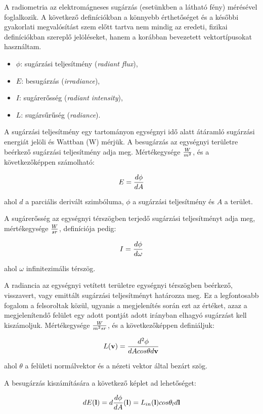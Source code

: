 A radiometria az elektromágneses sugárzás (esetünkben a látható fény) mérésével foglalkozik. A következő definíciókban a könnyebb érthetőséget és a későbbi gyakorlati megvalósítást szem előtt tartva nem mindig az eredeti, fizikai definíciókban szereplő jelöléseket, hanem a korábban bevezetett vektortípusokat használtam.

\begin{itemize}[noitemsep]
\item \(\phi\): sugárzási teljesítmény (\textit{radiant flux}),
\item \(E\): besugárzás (\textit{irradiance}),
\item \(I\): sugárerősség (\textit{radiant intensity}),
\item \(L\): sugársűrűség (\textit{radiance}).
\end{itemize}

A sugárzási teljesítmény egy tartományon egységnyi idő alatt átáramló sugárzási energiát jelöli és Wattban (W) mérjük. A besugárzás az egységnyi területre beérkező sugárzási teljesítmény adja meg. Mértékegysége \(W \over m^2\), és a következőképpen számolható:

\[
E = { { d\phi } \over { dA } }
\]

ahol \(d\) a parciális derivált szimbóluma, \(\phi\) a sugárzási teljesítmény és \(A\) a terület.

A sugárerősség az egységnyi térszögben terjedő sugárzási teljesítményt adja meg, mértékegysége \(W \over {sr}\), definíciója pedig:

\[
I = { { d\phi } \over { d\omega } }
\]

ahol \(\omega\) infinitezimális térszög.

A radiancia az egységnyi vetített területre egységnyi térszögben beérkező, visszavert, vagy emittált sugárzási teljesítményt határozza meg. Ez a legfontosabb fogalom a felsoroltak közül, ugyanis a megjelenítés során ezt az értéket, azaz a megjelenítendő felület egy adott pontját adott irányban elhagyó sugárzást kell kiszámoljuk. Mértékegysége \(W \over {m^2sr}\), és a következőképpen definiáljuk:

\[
L(\mathbf{v}) = { { d^2\phi } \over { dA cos\theta d\mathbf{v} } }
\]

ahol \(\theta\) a felületi normálvektor és a nézeti vektor által bezárt szög.

A besugárzás kiszámítására a következő képlet ad lehetőséget:

\[
dE(\mathbf{l}) = d { {d\phi} \over {dA} } (\mathbf{l}) = L_{in}(\mathbf{l}) cos\theta_l d\mathbf{l}
\]

